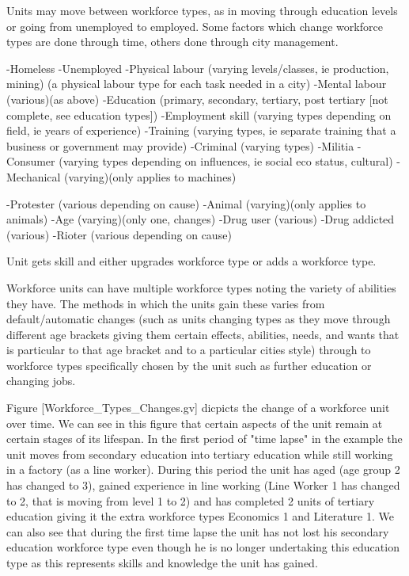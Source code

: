 Units may move between workforce types, as in moving through education levels or going from unemployed to employed. Some factors which change workforce types are done through time, others done through city management.


-Homeless
-Unemployed
-Physical labour (varying levels/classes, ie production, mining)
	(a physical labour type for each task needed in a city) 
-Mental labour (various)(as above)
-Education (primary, secondary, tertiary, post tertiary [not complete, see education types])
-Employment skill (varying types depending on field, ie years of experience)
-Training (varying types, ie separate training that a business or government may provide)
-Criminal (varying types)
-Militia
-Consumer (varying types depending on influences, ie social eco status, cultural)
-Mechanical (varying)(only applies to machines)

-Protester (various depending on cause)
-Animal (varying)(only applies to animals)
-Age (varying)(only one, changes)
-Drug user (various)
-Drug addicted (various)
-Rioter (various depending on cause)



Unit gets skill and either upgrades workforce type or adds a workforce type.

Workforce units can have multiple workforce types noting the variety of abilities they have. The methods in which the units gain these varies from default/automatic changes (such as units changing types as they move through different age brackets giving them certain effects, abilities, needs, and wants that is particular to that age bracket and to a particular cities style) through to workforce types specifically chosen by the unit such as further education or changing jobs. 

Figure [Workforce_Types_Changes.gv] dicpicts the change of a workforce unit over time. We can see in this figure that certain aspects of the unit remain at certain stages of its lifespan. In the first period of "time lapse" in the example the unit moves from secondary education into tertiary education while still working in a factory (as a line worker). During this period the unit has aged (age group 2 has changed to 3), gained experience in line working (Line Worker 1 has changed to 2, that is moving from level 1 to 2) and has completed 2 units of tertiary education giving it the extra workforce types Economics 1 and Literature 1. We can also see that during the first time lapse the unit has not lost his secondary education workforce type even though he is no longer undertaking this education type as this represents skills and knowledge the unit has gained. 

